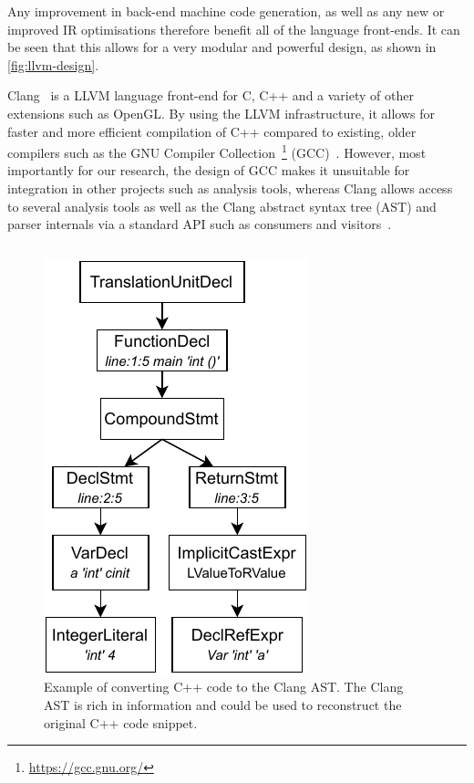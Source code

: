 \documentclass{mpaper}
\begin{document}
    Any improvement in back-end machine code generation, as well as any new or improved IR optimisations therefore benefit all of the language front-ends.
    It can be seen that this allows for a very modular and powerful design, as shown in \autoref{fig:llvm-design}.
    
    Clang~\cite{Lattner2008} is a LLVM language front-end for C, C++ and a variety of other extensions such as OpenGL.
    By using the LLVM infrastructure, it allows for faster and more efficient compilation of C++ compared to existing, older compilers such as the GNU Compiler Collection~\footnote{\url{https://gcc.gnu.org/}} (GCC)~\cite{Lattner2008}.
    However, most importantly for our research, the design of GCC makes it unsuitable for integration in other projects such as analysis tools, whereas Clang allows access to several analysis tools as well as the Clang abstract syntax tree (AST) and parser internals via a standard API such as consumers and visitors~\cite{Duffy2014}.
    
    \begin{figure}
        \centering
        \inputminted{c++}{code/code-to-ast.cpp}
        \includegraphics{images/code-to-ast.pdf}
        \caption{Example of converting C++ code to the Clang AST. The Clang AST is rich in information and could be used to reconstruct the original C++ code snippet.}
        \label{fig:code-to-ast-example}
    \end{figure}
    
\end{document}
